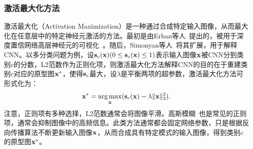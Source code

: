 \subsubsection*{激活最大化方法}
激活最大化（Activation Maximization）是一种通过合成特定输入图像，从而最大化在任意层中的特定神经元激活的方法。最初是由Erhan等人~\cite{erhan2009visualizing}提出的，被用于深度置信网络高层神经元的可视化~\cite{hinton2006fast}。随后，Simonyan等人~\cite{simonyan2013deep}将其扩展，用于解释CNN。以多分类问题为例，设$\mathbf{s}_{c}(\mathbf{x})(0\leq \mathbf{s}_{c}(\mathbf{x}) \leq 1)$表示输入图像$\mathbf{x}$被CNN分到类别$c$的分数，L2范数作为正则化项，则激活最大化方法解释CNN的目的在于重建类别$c$对应的原型图$\mathbf{x^*}$，使得$\mathbf{s}_c$最大，设$\lambda$是平衡两项的超参数，激活最大化方法可形式化为：
\begin{equation}
\mathbf{x}^*=\underset{\mathbf{x}}{\operatorname{arg\,max}}( {\mathbf{s}}_{c}(\mathbf{x})-\lambda\|\mathbf{x}\|_{2}^{2}).
\end{equation}
注意，正则项有多种选择，L2范数通常会将图像平滑。高斯模糊~\cite{haddad1991class}也是常见的正则项，通常会抑制图像中的高频信息。此类方法通常都会固定网络参数，只是根据反向传播算法不断更新输入图像$\mathbf{x}$，从而合成具有特定模式的输入图像，得到类别$c$的原型图$\mathbf{x}^*$。
